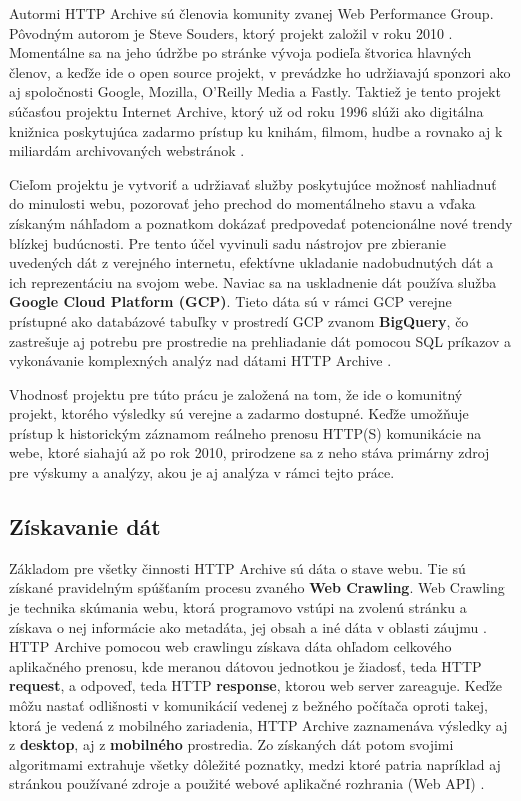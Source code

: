 Autormi HTTP Archive sú členovia komunity zvanej Web Performance Group. Pôvodným autorom je Steve Souders, ktorý projekt založil v roku 2010 \cite{httparchive-faq}.
Momentálne sa na jeho údržbe po stránke vývoja podieľa štvorica hlavných členov, a keďže ide o open source projekt, v prevádzke ho udržiavajú sponzori ako aj spoločnosti Google, Mozilla, O'Reilly Media a Fastly.
Taktiež je tento projekt súčasťou projektu Internet Archive, ktorý už od roku 1996 slúži ako digitálna knižnica poskytujúca zadarmo prístup ku knihám, filmom, hudbe a rovnako aj k miliardám archivovaných webstránok \cite{httparchive-about}.

\pagebreak

Cieľom projektu je vytvoriť a udržiavať služby poskytujúce možnosť nahliadnuť do minulosti webu, pozorovať jeho prechod do momentálneho stavu a vďaka získaným náhľadom a poznatkom dokázať
predpovedať potencionálne nové trendy blízkej budúcnosti. 
Pre tento účel vyvinuli sadu nástrojov pre zbieranie uvedených dát z verejného internetu, efektívne ukladanie nadobudnutých dát a ich reprezentáciu na svojom webe.
Naviac sa na uskladnenie dát používa služba \textbf{Google Cloud Platform (GCP)}.
Tieto dáta sú v rámci GCP verejne prístupné ako databázové tabuľky v prostredí GCP zvanom \textbf{BigQuery}, čo zastrešuje aj potrebu pre prostredie na prehliadanie dát pomocou SQL príkazov 
a vykonávanie komplexných analýz nad dátami HTTP Archive \cite{httparchive-faq}. 

Vhodnosť projektu pre túto prácu je založená na tom, že ide o komunitný projekt, ktorého výsledky sú verejne a zadarmo dostupné. Keďže umožňuje prístup k historickým záznamom reálneho prenosu HTTP(S) komunikácie na webe, ktoré siahajú až po rok 2010, prirodzene sa z neho stáva primárny zdroj pre výskumy a analýzy, akou je aj analýza v rámci tejto práce.


\subsection{Získavanie dát}
\label{fetching-data}

Základom pre všetky činnosti HTTP Archive sú dáta o stave webu. Tie sú získané pravidelným spúšťaním procesu zvaného \textbf{Web Crawling}.
Web Crawling je technika skúmania webu, ktorá programovo vstúpi na zvolenú stránku a získava o nej informácie ako metadáta, jej obsah a iné dáta v oblasti záujmu \cite{httparchive-webcrawling}.
HTTP Archive pomocou web crawlingu získava dáta ohľadom celkového aplikačného prenosu, kde meranou dátovou jednotkou je žiadosť, teda HTTP \textbf{request}, a odpoveď, teda HTTP \textbf{response}, ktorou web server zareaguje. 
Keďže môžu nastať odlišnosti v komunikácií vedenej z bežného počítača oproti takej, ktorá je vedená z mobilného zariadenia, HTTP Archive zaznamenáva výsledky aj z \textbf{desktop}, aj z \textbf{mobilného} prostredia.
Zo získaných dát potom svojimi algoritmami extrahuje všetky dôležité poznatky, medzi ktoré patria napríklad aj stránkou používané zdroje a použité webové aplikačné rozhrania (Web API) \cite{httparchive-homepage}.

